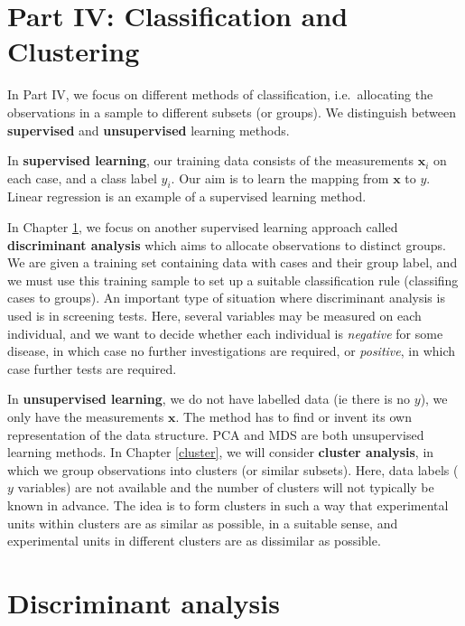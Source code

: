 \documentclass[
]{book}
\theoremstyle{definition}
\theoremstyle{definition}
\theoremstyle{definition}
\theoremstyle{definition}
\theoremstyle{remark}
\begin{document}
\hypertarget{part-iv-classification-and-clustering}{%
\chapter*{Part IV: Classification and Clustering}\label{part-iv-classification-and-clustering}}

In Part IV, we focus on different methods of classification,
i.e.~allocating the observations in a sample to different subsets (or
groups). We distinguish between \textbf{supervised} and \textbf{unsupervised} learning methods.

In \textbf{supervised learning}, our training data consists of the measurements \(\mathbf x_i\) on each case, and a class label \(y_i\). Our aim is to learn the mapping from \(\mathbf x\) to \(y\). Linear regression is an example of a supervised learning method.

In Chapter \ref{lda}, we focus on another supervised learning approach called \textbf{discriminant analysis} which aims to allocate observations to distinct groups. We are given a training set containing data with cases and their group label, and we must use this training sample to set up a suitable classification rule (classifing cases to groups). An important type of situation where discriminant analysis is used is in screening tests. Here, several variables may be measured on each individual, and we want to decide whether each individual is \emph{negative} for some disease, in which case no further investigations are required, or \emph{positive}, in which case further tests are required.

In \textbf{unsupervised learning}, we do not have labelled data (ie there is no \(y\)), we only have the measurements \(\mathbf x\). The method has to find or invent its own representation of the data structure. PCA and MDS are both unsupervised learning methods. In Chapter \ref{cluster}, we will consider \textbf{cluster analysis},
in which we group observations into clusters (or similar subsets).
Here, data labels (\(y\) variables) are not available and the number of clusters will
not typically be known in advance. The idea is to form clusters in such a way that experimental units within clusters are as similar as possible, in a suitable sense,
and experimental units in different clusters are as dissimilar as possible.

\hypertarget{lda}{%
\chapter{Discriminant analysis}\label{lda}}
\end{document}
